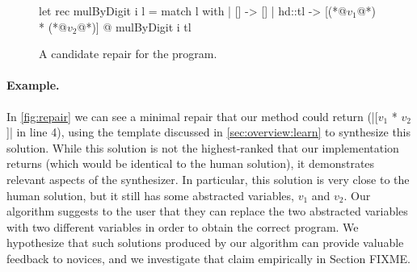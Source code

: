 \begin{figure}[ht]
  \begin{ecode}
  let rec mulByDigit i l =
    match l with
    | []     -> []
    | hd::tl -> [(*@$v_1$@*) * (*@$v_2$@*)] @ mulByDigit i tl
  \end{ecode}
  \caption{A candidate repair for the \mbd program.}
  \label{fig:repair}
  \end{figure}

\paragraph{Example.} In \autoref{fig:repair} we can see a minimal repair that
our method could return (|[$v_1$ * $v_2$]| in line 4), using the template
discussed in \autoref{sec:overview:learn} to synthesize this solution. While
this solution is not the highest-ranked that our implementation returns (which
would be identical to the human solution), it demonstrates relevant aspects of
the synthesizer. In particular, this solution is very close to the human
solution, but it still has some abstracted variables, $v_1$ and $v_2$. Our
algorithm suggests to the user that they can replace the two abstracted
variables with two different variables in order to obtain the correct program.
We hypothesize that such solutions produced by our algorithm can provide
valuable feedback to novices, and we investigate that claim empirically in
Section FIXME.
